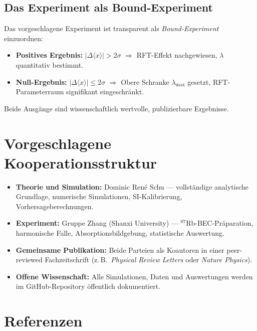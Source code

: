 \documentclass[a4paper,11pt]{article}
\begin{document}
\subsection{Das Experiment als Bound-Experiment}

Das vorgeschlagene Experiment ist transparent als \emph{Bound-Experiment}
einzuordnen:
\begin{itemize}
  \item \textbf{Positives Ergebnis:} $|\Delta\langle x\rangle| > 2\sigma$
    $\Rightarrow$ RFT-Effekt nachgewiesen, $\lambda$ quantitativ bestimmt.
  \item \textbf{Null-Ergebnis:} $|\Delta\langle x\rangle| \leq 2\sigma$
    $\Rightarrow$ Obere Schranke $\lambda_{\max}$ gesetzt, RFT-Parameterraum
    signifikant eingeschränkt.
\end{itemize}
Beide Ausgänge sind wissenschaftlich wertvolle, publizierbare Ergebnisse.

\section{Vorgeschlagene Kooperationsstruktur}

\begin{itemize}
  \item \textbf{Theorie und Simulation:}
    Dominic Ren\'e Schu ---
    vollständige analytische Grundlage, numerische Simulationen,
    SI-Kalibrierung, Vorhersageberechnungen.
  \item \textbf{Experiment:}
    Gruppe Zhang (Shanxi University) ---
    $^{87}$Rb-BEC-Präparation, harmonische Falle, Absorptionsbildgebung,
    statistische Auswertung.
  \item \textbf{Gemeinsame Publikation:}
    Beide Parteien als Koautoren in einer peer-reviewed Fachzeitschrift
    (z.\,B.\ \textit{Physical Review Letters} oder
    \textit{Nature Physics}).
  \item \textbf{Offene Wissenschaft:}
    Alle Simulationen, Daten und Auswertungen werden im
    GitHub-Repository öffentlich dokumentiert.
\end{itemize}

\section{Referenzen}
\end{document}
